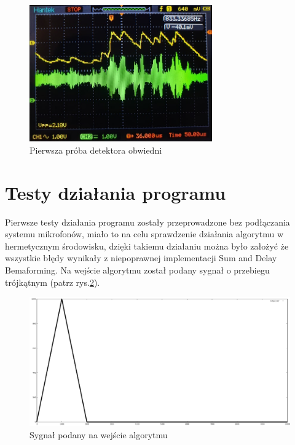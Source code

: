 \documentclass[eng,printmode]{mgr}
\begin{document}
\begin{figure}[ht]

    \centering

  \includegraphics[width=0.7\textwidth, angle=0]{obwiednia_syg1.png}

    \caption{Pierwsza próba detektora obwiedni}
 \label{fig-przebieg1}
    

\end{figure}





\section{Testy działania programu}
Pierwsze testy działania programu zostały przeprowadzone bez podłączania systemu mikrofonów, miało to na celu sprawdzenie działania algorytmu w hermetycznym środowisku, dzięki takiemu działaniu można było założyć że wszystkie błędy wynikały z niepoprawnej implementacji Sum and Delay Bemaforming.
Na wejście algorytmu został podany sygnał o przebiegu trójkątnym (patrz rys.\ref{fig-sygnal}).
\begin{figure}[!ht]

    \centering

  \includegraphics[width=1\textwidth, angle=0]{sygnal.png}

    \caption{Sygnał podany na wejście algorytmu}
 \label{fig-sygnal}
    

\end{figure}
\end{document}
